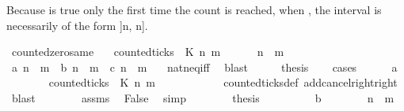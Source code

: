 \begin{isabellebody}
\endisatagproof
{\isafoldproof}%
%
\isadelimproof
%
\endisadelimproof
%
\begin{isamarkuptext}%
Because  is true only the first time the count is reached,
  when , the interval is necessarily of the form ]n, n].%
\end{isamarkuptext}\isamarkuptrue%
\isamarkupfalse%
\ counted{\isacharunderscore}zero{\isacharunderscore}same{\isacharcolon}\isanewline
\ \ \ {\isacartoucheopen}counted{\isacharunderscore}ticks\ {\isasymrho}\ K\ n\ m\ {}{\isacartoucheclose}\isanewline
\ \ \ \ \ {\isacartoucheopen}n\ {\isacharequal}\ m{\isacartoucheclose}\isanewline
%
\isadelimproof
%
\endisadelimproof
%
\isatagproof
{}\isamarkupfalse%
\ {\isacharminus}\isanewline
\ \ \isamarkupfalse%
\ {\isacharparenleft}a{\isacharparenright}\ {\isacartoucheopen}n\ {\isacharless}\ m{\isacartoucheclose}\ {\isacharbar}\ {\isacharparenleft}b{\isacharparenright}\ {\isacartoucheopen}n\ {\isachargreater}\ m{\isacartoucheclose}\ {\isacharbar}\ {\isacharparenleft}c{\isacharparenright}\ {\isacartoucheopen}n\ {\isacharequal}\ m{\isacartoucheclose}\ \ \isamarkupfalse%
\ nat{\isacharunderscore}neq{\isacharunderscore}iff\ \isamarkupfalse%
\ blast\isanewline
\ \ \isamarkupfalse%
\ \isamarkupfalse%
\ {\isacharquery}thesis\isanewline
\ \ \isamarkupfalse%
\ cases\isanewline
\ \ \ \ \isamarkupfalse%
\ a\isanewline
\ \ \ \ \ \ \isamarkupfalse%
\ {\isacartoucheopen}{\isasymnot}counted{\isacharunderscore}ticks\ {\isasymrho}\ K\ n\ m\ {}{\isacartoucheclose}\ \isanewline
\ \ \ \ \ \ \ \ \isamarkupfalse%
\ counted{\isacharunderscore}ticks{\isacharunderscore}def\ add{\isacharunderscore}cancel{\isacharunderscore}right{\isacharunderscore}right\ \isamarkupfalse%
\ blast\isanewline
\ \ \ \ \ \ \isamarkupfalse%
\ assms\ \isamarkupfalse%
\ False\ \isamarkupfalse%
\ simp\isanewline
\ \ \ \ \ \ \isamarkupfalse%
\ {\isacharquery}thesis\ \isacommand{{\isachardot}{\isachardot}}\isamarkupfalse%
\isanewline
\ \ \isamarkupfalse%
\isanewline
\ \ \ \ \isamarkupfalse%
\ b\isanewline
\ \ \ \ \ \ \isamarkupfalse%
\ {\isacartoucheopen}{\isasymnot}{\isacharparenleft}n\ {\isasymle}\ m{\isacharparenright}{\isacartoucheclose}\ \isamarkupfalse%

\end{isabellebody}
